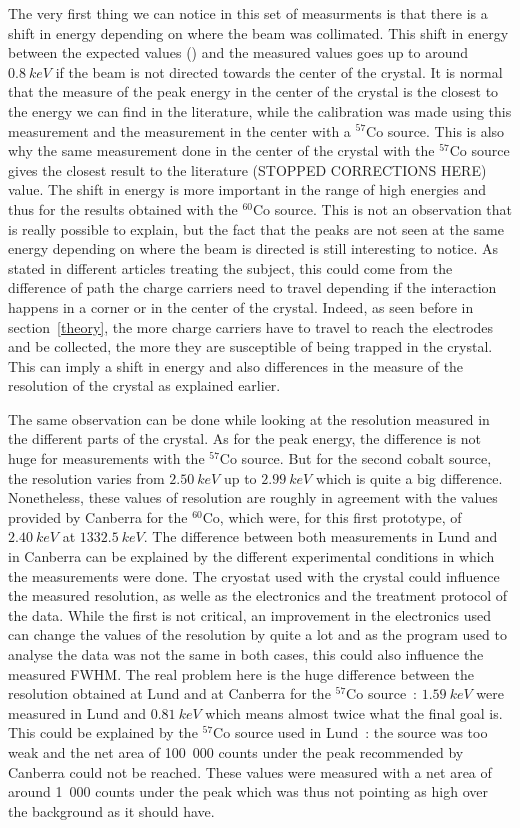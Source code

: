 \documentclass[11pt,a4paper]{article}
\begin{document}
The very first thing we can notice in this set of measurments is that there is a shift in energy depending on where the beam was collimated. This shift in energy between the expected values (\cite{lit}) and the measured values goes up to around $0.8~keV$ if the beam is not directed towards the center of the crystal. It is normal that the measure of the peak energy in the center of the crystal is the closest to the energy we can find in the literature, while the calibration was made using this measurement and the measurement in the center with a $^{57}$Co source. This is also why the same measurement done in the center of the crystal with the $^{57}$Co source gives the closest result to the literature (STOPPED CORRECTIONS HERE) value. The shift in energy is more important in the range of high energies and thus for the results obtained with the $^{60}$Co source. This is not an observation that is really possible to explain, but the fact that the peaks are not seen at the same energy depending on where the beam is directed is still interesting to notice. As stated in different articles treating the subject, this could come from the difference of path the charge carriers need to travel depending if the interaction happens in a corner or in the center of the crystal. Indeed, as seen before in section~\ref{theory}, the more charge carriers have to travel to reach the electrodes and be collected, the more they are susceptible of being trapped in the crystal. This can imply a shift in energy and also differences in the measure of the resolution of the crystal as explained earlier.

The same observation can be done while looking at the resolution measured in the different parts of the crystal. As for the peak energy, the difference is not huge for measurements with the $^{57}$Co source. But for the second cobalt source, the resolution varies from $2.50~keV$ up to $2.99~keV$ which is quite a big difference. Nonetheless, these values of resolution are roughly in agreement with the values provided by Canberra for the $^{60}$Co, which were, for this first prototype, of $2.40~keV$ at $1332.5~keV$. The difference between both measurements in Lund and in Canberra can be explained by the different experimental conditions in which the measurements were done. The cryostat used with the crystal could influence the measured resolution, as welle as the electronics and the treatment protocol of the data. While the first is not critical, an improvement in the electronics used can change the values of the resolution by quite a lot and as the program used to analyse the data was not the same in both cases, this could also influence the measured FWHM. The real problem here is the huge difference between the resolution obtained at Lund and at Canberra for the $^{57}$Co source~: $1.59~keV$ were measured in Lund and $0.81~keV$ which means almost twice what the final goal is. This could be explained by the $^{57}$Co source used in Lund~: the source was too weak and the net area of 100~000 counts under the peak recommended by Canberra could not be reached. These values were measured with a net area of around 1~000 counts under the peak which was thus not pointing as high over the background as it should have.
\end{document}
